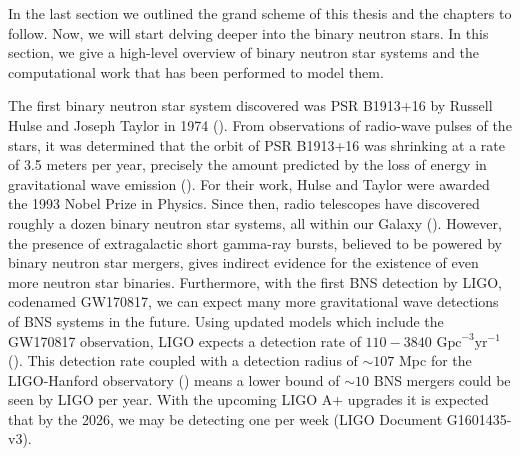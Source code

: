 


In the last section we outlined the grand scheme of this thesis and the chapters to follow. Now, we will start delving deeper into the binary neutron stars. In this section, we give a high-level overview of binary neutron star systems and the computational work that has been performed to model them. 


The first binary neutron star system discovered was PSR B1913+16 by Russell Hulse and Joseph Taylor in 1974 (\cite{hulse:1975uf}). From observations of radio-wave pulses of the stars, it was determined that the orbit of PSR B1913+16 was shrinking at a rate of 3.5 meters per year, precisely the amount predicted by the loss of energy in gravitational wave emission (\cite{1981sciam.245...74w}). For their work, Hulse and Taylor were awarded the 1993 Nobel Prize in Physics. Since then, radio telescopes have discovered roughly a dozen binary neutron star systems, all within our Galaxy (\cite{baiottireview2016}). However, the presence of extragalactic short gamma-ray bursts, believed to be powered by binary neutron star mergers, gives indirect evidence for the existence of even more neutron star binaries. Furthermore, with the first BNS detection by LIGO, codenamed GW170817, we can expect many more gravitational wave detections of BNS systems in the future. Using updated models which include the GW170817 observation, LIGO expects a detection rate of $110-3840$ $\text{Gpc}^{-3} \text{yr}^{-1}$ (\cite{ligo2018gwtc}). This detection rate coupled with a detection radius of $\sim 107$ Mpc for the LIGO-Hanford observatory  (\cite{abbott2017gw170817}) means a lower bound of $\sim 10$ BNS mergers could be seen by LIGO per year. With the upcoming LIGO A+ upgrades it is expected that by the 2026, we may be detecting one per week (LIGO Document G1601435-v3).

